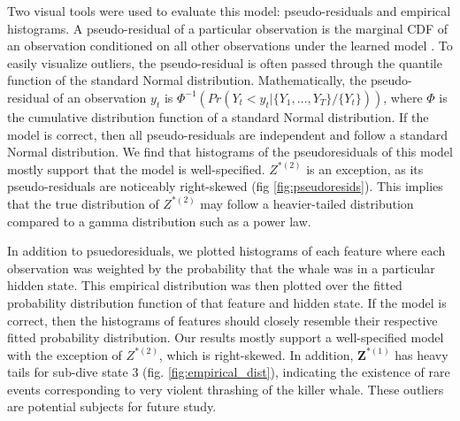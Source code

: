 Two visual tools were used to evaluate this model: pseudo-residuals and empirical histograms. A pseudo-residual of a particular observation is the marginal CDF of an observation conditioned on all other observations under the learned model \citep{Zucchini:2016}. To easily visualize outliers, the pseudo-residual is often passed through the quantile function of the standard Normal distribution. Mathematically, the pseudo-residual of an observation $y_t$ is $\Phi^{-1} \left(Pr(Y_t < y_t|\{Y_1,\ldots,Y_T\}/\{Y_t\}) \right)$, where $\Phi$ is the cumulative distribution function of a standard Normal distribution. If the model is correct, then all pseudo-residuals are independent and follow a standard Normal distribution. We find that histograms of the pseudoresiduals of this model mostly support that the model is well-specified. $Z^{*(2)}$ is an exception, as its pseudo-residuals are noticeably right-skewed (fig \ref{fig:pseudoresids}). This implies that the true distribution of $Z^{*(2)}$ may follow a heavier-tailed distribution compared to a gamma distribution such as a power law. 

In addition to psuedoresiduals, we plotted histograms of each feature where each observation was weighted by the probability that the whale was in a particular hidden state. This empirical distribution was then plotted over the fitted probability distribution function of that feature and hidden state. If the model is correct, then the histograms of features should closely resemble their respective fitted probability distribution. Our results mostly support a well-specified model with the exception of $Z^{*(2)}$, which is right-skewed. In addition, $\mathbf{Z}^{*(1)}$ has heavy tails for sub-dive state 3 (fig. \ref{fig:empirical_dist}), indicating the existence of rare events corresponding to very violent thrashing of the killer whale. These outliers are potential subjects for future study.